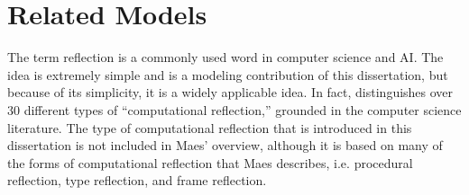 \chapter{Related Models}
\label{chapter:related_models}

The term reflection is a commonly used word in computer science and
AI.  The idea is extremely simple and is a modeling contribution of
this dissertation, but because of its simplicity, it is a widely
applicable idea.  In fact, \cite{maes:1987,maes:1988} distinguishes
over 30 different types of ``computational reflection,'' grounded in
the computer science literature.  The type of computational reflection
that is introduced in this dissertation is not included in Maes'
overview, although it is based on many of the forms of computational
reflection that Maes describes, i.e. procedural reflection, type
reflection, and frame reflection.

